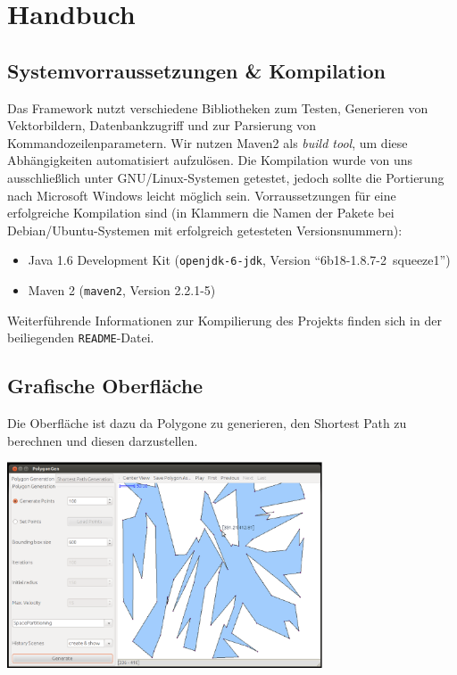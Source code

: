 \section{Handbuch}
\label{sec:manual}
\subsection{Systemvorraussetzungen \& Kompilation}
Das Framework nutzt verschiedene Bibliotheken zum Testen, Generieren von Vektorbildern, Datenbankzugriff und zur Parsierung von Kommandozeilenparametern. Wir nutzen Maven2 als \emph{build tool}, um diese Abhängigkeiten automatisiert aufzulösen. Die Kompilation wurde von uns ausschließlich unter GNU/Linux-Systemen getestet, jedoch sollte die Portierung nach Microsoft Windows leicht möglich sein. Vorraussetzungen für eine erfolgreiche Kompilation sind (in Klammern die Namen der Pakete bei Debian/Ubuntu-Systemen mit erfolgreich getesteten Versionsnummern):
\begin{itemize}
	\item Java 1.6 Development Kit (\texttt{openjdk-6-jdk}, Version \enquote{6b18-1.8.7-2~squeeze1})
	\item Maven 2 (\texttt{maven2}, Version 2.2.1-5)
\end{itemize}

Weiterführende Informationen zur Kompilierung des Projekts finden sich in der beiliegenden \texttt{README}-Datei.

\subsection{Grafische Oberfläche}
Die Oberfläche ist dazu da Polygone zu generieren, den Shortest Path zu berechnen und diesen darzustellen.\\
\begin{center}
\includegraphics[width=0.7\textwidth]{img/GUI.eps}
\end{center}

